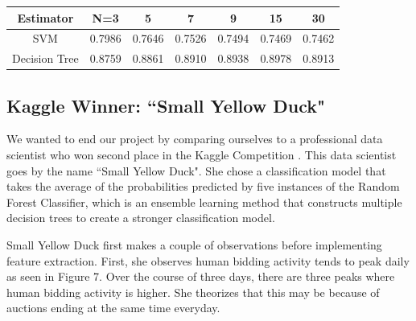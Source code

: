 \documentclass{article} %
\begin{document}
\begin{tabular}
{c|cccccc}
Estimator & N=3 & 5 & 7 & 9 & 15 & 30\\
\hline
SVM & 0.7986 & 0.7646 & 0.7526 & 0.7494 & 0.7469 & 0.7462\\
Decision Tree & 0.8759 & 0.8861 & 0.8910 & 0.8938 & 0.8978 & 0.8913
\end{tabular}

\subsection{Kaggle Winner: ``Small Yellow Duck"}

We wanted to end our project by comparing ourselves to a professional data scientist who won second place in the Kaggle Competition \cite{SYD}. This data scientist goes by the name ``Small Yellow Duck".
She chose a classification model that takes the average of the probabilities predicted by five instances of the Random Forest Classifier, which is an ensemble learning method that constructs multiple decision trees to create a stronger classification model.

Small Yellow Duck first makes a couple of observations before implementing feature extraction.
First, she observes human bidding activity tends to peak daily as seen in Figure 7. %
Over the course of three days, there are three peaks where human bidding activity is higher.
She theorizes that this may be because of auctions ending at the same time everyday.


\begin{figure}[h]
\centering
{}
\end{figure}
\end{document}
